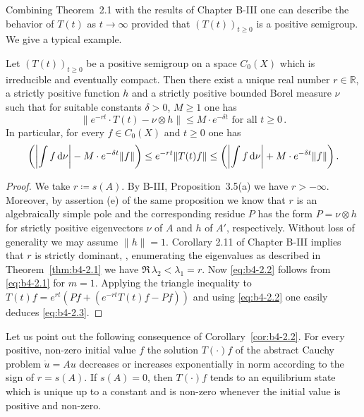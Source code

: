 Combining Theorem~2.1 with the results of Chapter B-III one can describe
the behavior of $T(t)$ as $t \to \infty$ provided that $(T(t))_{t \geq 0}$ is a
positive semigroup.
We give a typical example.

\begin{corollary}\label{cor:b4-2.2}
	Let $(T(t))_{t \geq 0}$ be a positive semigroup on a space
	$C_{0}(X)$ which is irreducible and eventually compact.
	Then there exist a
	unique real number $r \in \mathbb{R}$, a strictly positive function $h$ and a
	strictly positive bounded Borel measure $\nu$ such that for suitable
	constants $\delta > 0$, $M \geq 1$ one has
	\begin{equation}\label{eq:b4-2.2}
		\|e^{-rt}\cdot T(t) - \nu\otimes h\| \leq M\cdot e^{-\delta t} \text{ for all } t \geq 0\,.
	\end{equation}
	In particular, for every $f \in C_{0}(X)$ and $t \geq 0$ one has
	\begin{equation}\label{eq:b4-2.3}\text{$
		\left(\left|\int f \mathop{}\!\mathrm{d}{\nu}\right| - M\cdot e^{-\delta t}\|f\|\right) \leq e^{-rt}\|T(t)f\| \leq \left(\left|\int f \mathop{}\!\mathrm{d}{\nu}\right| + M\cdot e^{-\delta t}\|f\|\right).$}
	\end{equation}
\end{corollary}

\begin{proof}
	We take $r  \coloneq  s(A)$.
	By B-III, Proposition~3.5(a) we have $r > -\infty$.
	Moreover, by assertion (e) of the same proposition we know that $r$ is
	an algebraically simple pole and the corresponding residue $P$ has the
	form $P = \nu \otimes h$ for strictly positive eigenvectors $\nu$ of $A$
	and $h$ of $A'$, respectively.
	Without loss of generality we may assume
	$\|h\| = 1$.
	Corollary 2.11 of Chapter B-III implies that $r$ is strictly
	dominant, \ie, enumerating the eigenvalues as described in Theorem~\ref{thm:b4-2.1} we
	have $\Re\,\lambda_2 < \lambda_1 = r$.
	Now \eqref{eq:b4-2.2} follows from \eqref{eq:b4-2.1} for $m = 1$.
%
%
Applying the triangle inequality to $T(t)f = e^{rt}(Pf + (e^{-rt}T(t)f-Pf))$
and using \eqref{eq:b4-2.2} one easily deduces \eqref{eq:b4-2.3}.
\end{proof}

Let us point out the following consequence of Corollary~\ref{cor:b4-2.2}.
For every positive, non-zero initial value $f$ the solution $T(\cdot)f$
of the abstract Cauchy problem $\dot{u} = Au$ decreases or increases
exponentially in norm according to the sign of $r = s(A)$.
If $s(A) = 0$, then $T(\cdot)f$ tends to an equilibrium state which is
unique up to a constant and is non-zero whenever the initial value is
positive and non-zero.

